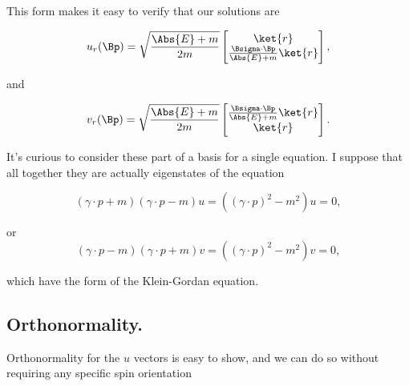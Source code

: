 This form makes it easy to verify that our solutions are

\begin{equation}\label{eqn:desaiDiracAdjoint:30a}
u_r(\Bp) =
\sqrt{\frac{\Abs{E} + m}{2m}}
\begin{bmatrix}
\ket{r} \\
\frac{\Bsigma \cdot \Bp}{\Abs{E} + m} \ket{r}
\end{bmatrix},
\end{equation}

and

\begin{equation}\label{eqn:desaiDiracAdjoint:50a}
v_r(\Bp) =
\sqrt{\frac{\Abs{E} + m}{2m}}
\begin{bmatrix}
\frac{\Bsigma \cdot \Bp}{\Abs{E} + m} \ket{r} \\
\ket{r} \\
\end{bmatrix}.
\end{equation}

It's curious to consider these part of a basis for a single equation.  I suppose that all together they are actually eigenstates of the equation

\begin{equation}\label{eqn:desaiDiracAdjoint:n}
(\gamma \cdot p + m) (\gamma \cdot p - m) u = ((\gamma \cdot p)^2 - m^2) u = 0,
\end{equation}

or
\begin{equation}\label{eqn:desaiDiracAdjoint:n}
(\gamma \cdot p - m) (\gamma \cdot p + m) v = ((\gamma \cdot p)^2 - m^2) v = 0,
\end{equation}

which have the form of the Klein-Gordan equation.

\subsection{Orthonormality.}

Orthonormality for the $u$ vectors is easy to show, and we can do so without requiring any specific spin orientation

